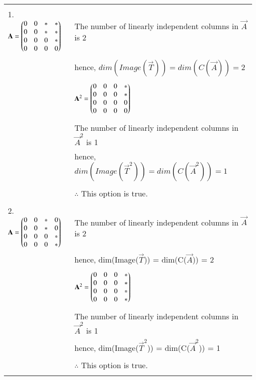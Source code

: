 \onecolumn
\begin{longtable}{|l|l|}
    \hline
        & \\
        1. $\mathbf{A} = \begin{pmatrix}0 & 0 & * & * \\ 0 & 0 & * & * \\ 0 & 0 & 0 & * \\ 0 & 0 & 0 & 0\end{pmatrix}$ & The number of linearly independent columns in $\vec{A}$ is 2\\
    \hline
        & \\
        & hence, $dim(Image(\vec{T})) = dim(C(\vec{A})) = 2$\\
        & \\
        & $\mathbf{A}^2 = \begin{pmatrix}0 & 0 & 0 & * \\ 0 & 0 & 0 & * \\ 0 & 0 & 0 & 0 \\ 0 & 0 & 0 & 0\end{pmatrix}$\\
        & \\
        & The number of linearly independent columns in $\vec{A}^2$ is 1\\
        & hence, $dim(Image(\vec{T}^2)) = dim(C(\vec{A}^2)) = 1$\\
        & \\
        & $\therefore$ This option is true.\\
    \hline
        & \\
        2. $\mathbf{A} = \begin{pmatrix}0 & 0 & * & 0 \\ 0 & 0 & * & 0 \\ 0 & 0 & 0 & * \\ 0 & 0 & 0 & *\end{pmatrix}$ & The number of linearly independent columns in $\vec{A}$ is 2\\
        & hence, dim(Image($\vec{T}$)) = dim(C($\vec{A}$)) = 2\\
        & \\
        & $\mathbf{A}^2 = \begin{pmatrix}0 & 0 & 0 & * \\ 0 & 0 & 0 & * \\ 0 & 0 & 0 & * \\ 0 & 0 & 0 & *\end{pmatrix}$\\
        & \\
        & The number of linearly independent columns in $\vec{A}^2$ is 1\\
        & hence, dim(Image($\vec{T}^2$)) = dim(C($\vec{A}^2$)) = 1\\
        & \\
        & $\therefore$ This option is true.\\
    \hline
        & \\

\end{longtable}
